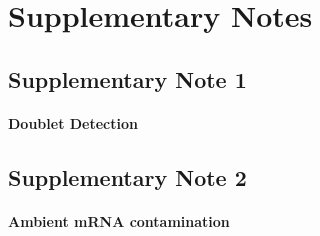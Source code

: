 

\chapter{Supplementary Notes}

\clearpage

\section{Supplementary Note 1}
\label{sec:suppnote1}
\subsubsection{Doublet Detection}

\clearpage

\section{Supplementary Note 2}
\label{sec:suppnote2}
\subsubsection{Ambient mRNA contamination}

